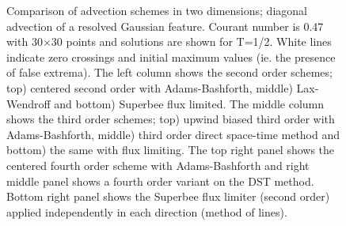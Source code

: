 \begin{figure}
\caption{
Comparison of advection schemes in two dimensions; diagonal advection
of a resolved Gaussian feature. Courant number is 0.47 with
30$\times$30 points and solutions are shown for T=1/2. White lines
indicate zero crossings and initial maximum values (ie. the presence
of false extrema).  The left column shows the second order schemes;
top) centered second order with Adams-Bashforth, middle) Lax-Wendroff
and bottom) Superbee flux limited. The middle column shows the third
order schemes; top) upwind biased third order with Adams-Bashforth,
middle) third order direct space-time method and bottom) the same with
flux limiting. The top right panel shows the centered fourth order
scheme with Adams-Bashforth and right middle panel shows a fourth
order variant on the DST method. Bottom right panel shows the Superbee
flux limiter (second order) applied independently in each direction
(method of lines).
\label{fig:advect-2d-hi-diag}
}
\end{figure}



